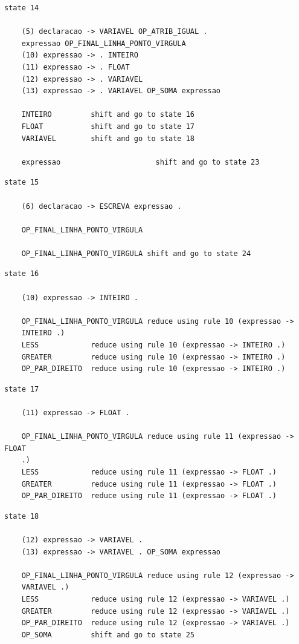 \documentclass[a4paper,12pt]{article}
\begin{document}
\begin{verbatim}
state 14

    (5) declaracao -> VARIAVEL OP_ATRIB_IGUAL . 
    expressao OP_FINAL_LINHA_PONTO_VIRGULA
    (10) expressao -> . INTEIRO
    (11) expressao -> . FLOAT
    (12) expressao -> . VARIAVEL
    (13) expressao -> . VARIAVEL OP_SOMA expressao

    INTEIRO         shift and go to state 16
    FLOAT           shift and go to state 17
    VARIAVEL        shift and go to state 18

    expressao                      shift and go to state 23

\end{verbatim}

\begin{verbatim}
state 15

    (6) declaracao -> ESCREVA expressao . 
    
    OP_FINAL_LINHA_PONTO_VIRGULA

    OP_FINAL_LINHA_PONTO_VIRGULA shift and go to state 24

\end{verbatim}

\begin{verbatim}
state 16

    (10) expressao -> INTEIRO .

    OP_FINAL_LINHA_PONTO_VIRGULA reduce using rule 10 (expressao -> 
    INTEIRO .)
    LESS            reduce using rule 10 (expressao -> INTEIRO .)
    GREATER         reduce using rule 10 (expressao -> INTEIRO .)
    OP_PAR_DIREITO  reduce using rule 10 (expressao -> INTEIRO .)

\end{verbatim}

\begin{verbatim}
state 17

    (11) expressao -> FLOAT .

    OP_FINAL_LINHA_PONTO_VIRGULA reduce using rule 11 (expressao -> FLOAT 
    .)
    LESS            reduce using rule 11 (expressao -> FLOAT .)
    GREATER         reduce using rule 11 (expressao -> FLOAT .)
    OP_PAR_DIREITO  reduce using rule 11 (expressao -> FLOAT .)

\end{verbatim}

\begin{verbatim}
state 18

    (12) expressao -> VARIAVEL .
    (13) expressao -> VARIAVEL . OP_SOMA expressao

    OP_FINAL_LINHA_PONTO_VIRGULA reduce using rule 12 (expressao -> 
    VARIAVEL .)
    LESS            reduce using rule 12 (expressao -> VARIAVEL .)
    GREATER         reduce using rule 12 (expressao -> VARIAVEL .)
    OP_PAR_DIREITO  reduce using rule 12 (expressao -> VARIAVEL .)
    OP_SOMA         shift and go to state 25

\end{verbatim}
\end{document}
